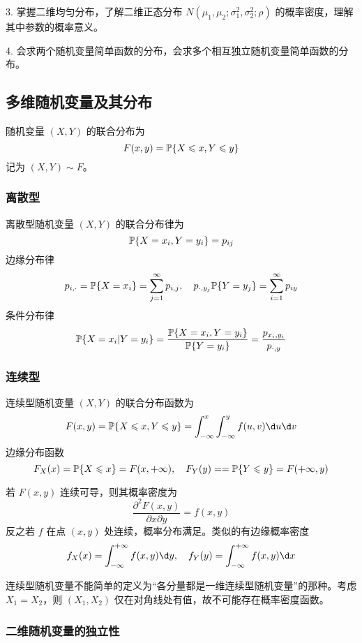 3. 掌握二维均匀分布，了解二维正态分布 $N(\mu_1, \mu_2; \sigma_1^2, \sigma_2^2; \rho)$ 的概率密度，理解其中参数的概率意义。

4. 会求两个随机变量简单函数的分布，会求多个相互独立随机变量简单函数的分布。

\subsection{多维随机变量及其分布}

随机变量 $(X,Y)$ 的联合分布为
\[ F(x,y) = \mathbb{P}\{X \leqslant x, Y \leqslant y\} \]
记为 $(X,Y) \sim F$。

\subsubsection*{离散型}

离散型随机变量 $(X,Y)$ 的联合分布律为
\[ \mathbb{P}\{X=x_i,Y=y_i\} = p_{ij} \]
边缘分布律
\[ p_{i,\cdot} = \mathbb{P}\{ X = x_i \} =  \sum_{j=1}^\infty p_{i,j}, \quad p_{\cdot,y_j} \mathbb{P}\{ Y = y_j \} =  \sum_{i=1}^\infty p_{iy} \]
条件分布律
\[ \mathbb{P}\{ X = x_i | Y = y_i \} = \frac{\mathbb{P}\{ X = x_i, Y = y_i \}}{\mathbb{P}\{Y = y_i \}} = \frac{p_{x_i,y_i}}{p_{\cdot,y}} \]

\subsubsection*{连续型}

连续型随机变量 $(X,Y)$ 的联合分布函数为
\[ F(x,y) = \bbP\{X \leqslant x, Y \leqslant y\} = \int_{-\infty}^{x} \int_{-\infty}^{y} f(u,v) \d u \d v \]
边缘分布函数
\[ F_{X}(x) = \mathbb{P}\{X \leqslant x\} = F(x, +\infty), \quad F_{Y}(y) =  = \mathbb{P}\{Y \leqslant y\} = F(+\infty, y) \]

若 $F(x, y)$ 连续可导，则其概率密度为
\[ \frac{\partial^2 F(x, y)}{\partial x \partial y} = f(x, y) \]
反之若 $f$ 在点 $(x, y)$ 处连续，概率分布满足。类似的有边缘概率密度
\[ f_{X}(x) = \int_{-\infty}^{+\infty} f(x,y) \d y, \quad f_{Y}(y) = \int_{-\infty}^{+\infty} f(x,y) \d x \]

\begin{note}
	连续型随机变量不能简单的定义为“各分量都是一维连续型随机变量”的那种。考虑 $X_1 = X_2$，则 $(X_1, X_2)$ 仅在对角线处有值，故不可能存在概率密度函数。
\end{note}

\subsubsection*{二维随机变量的独立性}


